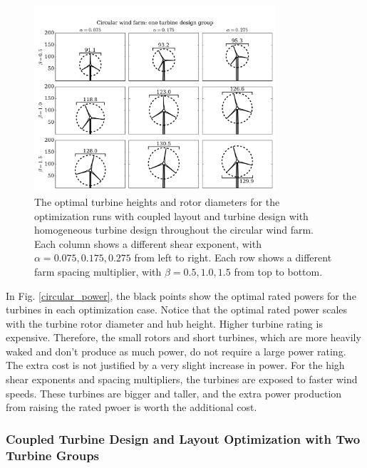 \begin{figure}[htbp]
  \centering
  \includegraphics[trim={0.5cm 0.3cm 0.3cm 1.75cm},clip,width=0.8\textwidth]{Figures/turbineSizesCircular_1.pdf}
  \caption{\label{circular_turbines_1} The optimal turbine heights and rotor diameters for the optimization runs with coupled layout and turbine design with homogeneous turbine design throughout the circular wind farm. Each column shows a different shear exponent, with $\alpha=0.075,0.175,0.275$ from left to right. Each row shows a different farm spacing multiplier, with $\beta=0.5,1.0,1.5$ from top to bottom.}
\end{figure}

In Fig. \ref{circular_power}, the black points show the optimal rated powers for the turbines in each optimization case. Notice that the optimal rated power scales with the turbine rotor diameter and hub height. Higher turbine rating is expensive. Therefore, the small rotors and short turbines, which are more heavily waked and don't produce as much power, do not require a large power rating. The extra cost is not justified by a very slight increase in power. For the high shear exponents and spacing multipliers, the turbines are exposed to faster wind speeds. These turbines are bigger and taller, and the extra power production from raising the rated pwoer is worth the additional cost.



\subsubsection{Coupled Turbine Design and Layout Optimization with Two Turbine Groups}

